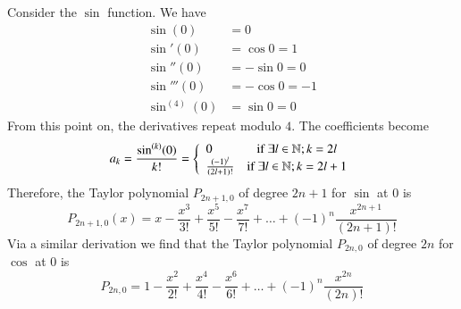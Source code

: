 \begin{eg}
    Consider the $\sin$ function. We have \begin{align*}
        \sin(0) &= 0 \\
        \sin'(0) &= \cos 0 = 1 \\
        \sin''(0) &= -\sin 0 = 0 \\
        \sin'''(0) &= -\cos 0 = -1 \\
        \sin^{(4)}(0) &= \sin 0 = 0
    \end{align*}
    From this point on, the derivatives repeat modulo $4$. The coefficients become \begin{equation*}
        a_k = \frac{\sin^{(k)}(0)}{k!} = \left\{\begin{array}{lc} 0 & \text{if } \exists l \in \mathbb N; k = 2l \\
            \frac{(-1)^{l}}{(2l+1)!} & \text{if } \exists l \in \mathbb N; k = 2l+1
        \end{array}\right.
    \end{equation*}
    Therefore, the Taylor polynomial $P_{2n+1,0}$ of degree $2n+1$ for $\sin$ at $0$ is \begin{equation*}
        P_{2n+1,0}(x) = x-\frac{x^3}{3!}+\frac{x^5}{5!} - \frac{x^7}{7!}+\hdots + (-1)^n\frac{x^{2n+1}}{(2n+1)!}
    \end{equation*}
    Via a similar derivation we find that the Taylor polynomial $P_{2n,0}$ of degree $2n$ for $\cos$ at $0$ is \begin{equation*}
        P_{2n,0} = 1 - \frac{x^2}{2!} + \frac{x^4}{4!} - \frac{x^6}{6!} + \hdots + (-1)^n\frac{x^{2n}}{(2n)!}
    \end{equation*}
\end{eg}


